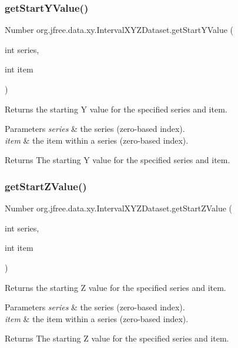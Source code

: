\subsubsection{\texorpdfstring{get\+Start\+Y\+Value()}{getStartYValue()}}
{\footnotesize\ttfamily Number org.\+jfree.\+data.\+xy.\+Interval\+X\+Y\+Z\+Dataset.\+get\+Start\+Y\+Value (\begin{DoxyParamCaption}\item[{int}]{series,  }\item[{int}]{item }\end{DoxyParamCaption})}

Returns the starting Y value for the specified series and item.


\begin{DoxyParams}{Parameters}
{\em series} & the series (zero-\/based index). \\
\hline
{\em item} & the item within a series (zero-\/based index).\\
\hline
\end{DoxyParams}
\begin{DoxyReturn}{Returns}
The starting Y value for the specified series and item. 
\end{DoxyReturn}
\mbox{\label{interfaceorg_1_1jfree_1_1data_1_1xy_1_1_interval_x_y_z_dataset_a6d10d8a41f3f2226fadefa51277f2c9f}} 
\subsubsection{\texorpdfstring{get\+Start\+Z\+Value()}{getStartZValue()}}
{\footnotesize\ttfamily Number org.\+jfree.\+data.\+xy.\+Interval\+X\+Y\+Z\+Dataset.\+get\+Start\+Z\+Value (\begin{DoxyParamCaption}\item[{int}]{series,  }\item[{int}]{item }\end{DoxyParamCaption})}

Returns the starting Z value for the specified series and item.


\begin{DoxyParams}{Parameters}
{\em series} & the series (zero-\/based index). \\
\hline
{\em item} & the item within a series (zero-\/based index).\\
\hline
\end{DoxyParams}
\begin{DoxyReturn}{Returns}
The starting Z value for the specified series and item. 
\end{DoxyReturn}


